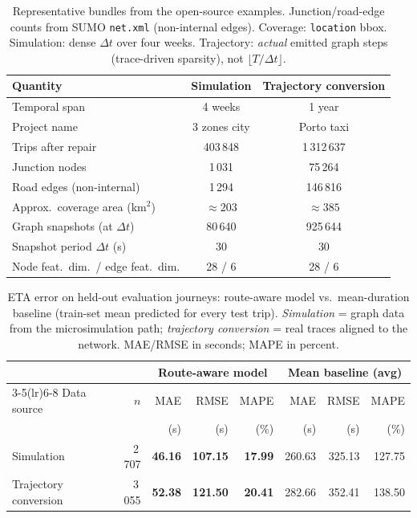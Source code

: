 
\begin{table}[t]
\caption{Representative bundles from the open-source examples. Junction/road-edge counts from SUMO \texttt{net.xml} (non-internal edges). Coverage: \texttt{location} bbox. Simulation: dense $\Delta t$ over four weeks. Trajectory: \emph{actual} emitted graph steps (trace-driven sparsity), not $\lfloor T/\Delta t\rfloor$.}
\label{tab:dataset_stats}
\centering
\small
\setlength{\tabcolsep}{4pt}
\begin{tabular}{@{}lcc@{}}
\toprule
Quantity & Simulation & Trajectory conversion \\
\midrule
Temporal span & 4 weeks & 1 year \\
Project name & 3 zones city & Porto taxi \\
Trips after repair & 403\,848 & 1\,312\,637 \\
Junction nodes & 1\,031 & 75\,264 \\
Road edges (non-internal) & 1\,294 & 146\,816 \\
Approx.\ coverage area (km$^2$) & $\approx 203$ & $\approx 385$ \\
Graph snapshots (at $\Delta t$) & 80\,640 & 925\,644 \\
Snapshot period $\Delta t$ (s) & 30 & 30 \\
Node feat.\ dim.\ / edge feat.\ dim. & 28 / 6 & 28 / 6 \\
\bottomrule
\end{tabular}
\end{table}

\begin{table}[t]
\caption{ETA error on held-out evaluation journeys: route-aware model vs.\ mean-duration baseline (train-set mean predicted for every test trip). \emph{Simulation} = graph data from the microsimulation path; \emph{trajectory conversion} = real traces aligned to the network. MAE/RMSE in seconds; MAPE in percent.}
\label{tab:eval_results}
\centering
\small
\setlength{\tabcolsep}{3pt}
\begin{tabular}{@{}l r rrr rrr@{}}
\toprule
 & & \multicolumn{3}{c}{Route-aware model} & \multicolumn{3}{c}{Mean baseline (avg)} \\
\cmidrule(lr){3-5}\cmidrule(lr){6-8}
Data source & $n$ & MAE & RMSE & MAPE & MAE & RMSE & MAPE \\
 & & (s) & (s) & (\%) & (s) & (s) & (\%) \\
\midrule
Simulation & 2\,707 & \textbf{46.16} & \textbf{107.15} & \textbf{17.99} & 260.63 & 325.13 & 127.75 \\
Trajectory conversion & 3\,055 & \textbf{52.38} & \textbf{121.50} & \textbf{20.41} & 282.66 & 352.41 & 138.50 \\
\bottomrule
\end{tabular}
\end{table}

